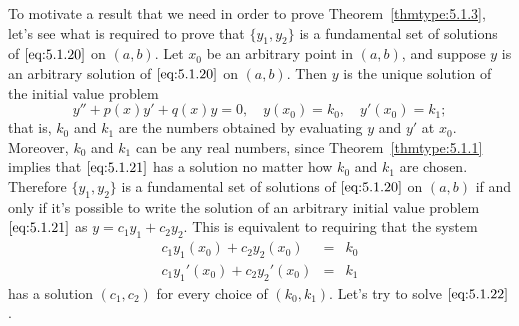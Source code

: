 \documentclass{ximera}
\begin{document}
To motivate a result that we need in order to prove
Theorem~\ref{thmtype:5.1.3},
 let's see what is required to prove that  $\{y_1,y_2\}$
is a  fundamental set of solutions of $\eqref{eq:5.1.20}$ on  $(a,b)$.
Let $x_0$ be an arbitrary point in  $(a,b)$, and
suppose  $y$ is an arbitrary  solution of
$\eqref{eq:5.1.20}$ on  $(a,b)$.  Then $y$ is the unique solution of the
initial value problem
\begin{equation}\label{eq:5.1.21}
y''+p(x)y'+q(x)y=0,\quad y(x_0)=k_0,\quad y'(x_0)=k_1;
\end{equation}
that is, $k_0$ and $k_1$ are the numbers obtained by evaluating $y$
and $y'$ at $x_0$. Moreover, $k_0$ and $k_1$ can be any real numbers,
since Theorem~\ref{thmtype:5.1.1} implies that $\eqref{eq:5.1.21}$ has a
solution no matter how $k_0$ and $k_1$ are chosen.
Therefore  $\{y_1,y_2\}$ is a fundamental set of solutions of
$\eqref{eq:5.1.20}$ on $(a,b)$ if and only if it's possible to write the
solution of an arbitrary initial value problem $\eqref{eq:5.1.21}$
as $y=c_1y_1+c_2y_2$. This is equivalent to requiring that the
system
\begin{equation}\label{eq:5.1.22}
\begin{array}{rcl}
c_1y_1(x_0)+c_2y_2(x_0)&=&k_0\\
c_1y_1'(x_0)+c_2y_2'(x_0)&=&k_1
\end{array}
\end{equation}
has  a solution $(c_1,c_2)$ for every choice of $(k_0,k_1)$.
Let's try to solve $\eqref{eq:5.1.22}$.
 
\end{document}
